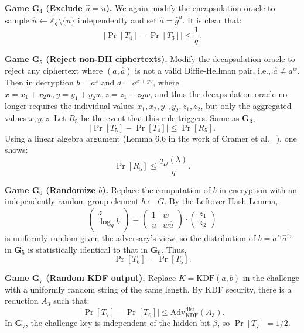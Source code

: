 \vspace{0.5em}
\noindent\textbf{Game $\mathbf{G}_4$ (Exclude $\hat{u} = u$).} 
We again modify the encapsulation oracle to sample $\hat{u} \gets \mathbb{Z}_q \setminus \{u\}$ independently and set $\hat{a} = \hat{g}^{\hat{u}}$. It is clear that:
$$
|\Pr[T_4] - \Pr[T_3]| \le \frac{1}{q}.
$$

\vspace{0.5em}
\noindent\textbf{Game $\mathbf{G}_5$ (Reject non-DH ciphertexts).} 
Modify the decapsulation oracle to reject any ciphertext where $(a, \hat{a})$ is not a valid Diffie-Hellman pair, i.e., $\hat{a}\ne a^w$. Then in decryption $b = a^z$ and $d = a^{x+yv}$, where $x=x_1+x_2w, y=y_1+y_2w, z=z_1+z_2w$, and thus the decapsulation oracle no longer requires the individual values $x_1, x_2, y_1, y_2, z_1, z_2$, but only the aggregated values $x, y, z$.
Let $R_5$ be the event that this rule triggers. Same as $\mathbf{G}_3$,
$$
|\Pr[T_5] - \Pr[T_4]| \le \Pr[R_5].
$$
Using a linear algebra argument (Lemma 6.6 in the work of Cramer et al. ~\cite{cramer2003design}), one shows:
$$
\Pr[R_5] \le \frac{q_D(\lambda)}{q}.
$$

\vspace{0.5em}
\noindent\textbf{Game $\mathbf{G}_6$ (Randomize $b$).} 
Replace the computation of $b$ in encryption with an independently random group element $b \gets G$.
By the Leftover Hash Lemma,
$$
\begin{pmatrix}z \\ \log_g b\end{pmatrix} = \begin{pmatrix}1 & w \\ u & w\hat{u}\end{pmatrix} \cdot \begin{pmatrix}z_1 \\ z_2\end{pmatrix}
$$
is uniformly random given the adversary's view, so the distribution of $b=a^{z_1} \hat{a}^{z_2}$ in $\mathbf{G}_5$ is statistically identical to that in $\mathbf{G}_6$. Thus,  
$$  
\Pr[T_6] = \Pr[T_5].  
$$

\vspace{0.5em}
\noindent\textbf{Game $\mathbf{G}_7$ (Random KDF output).} 
Replace $K = \text{KDF}(a,b)$ in the challenge with a uniformly random string of the same length. By KDF security, there is a reduction $A_3$ such that:
$$
|\Pr[T_7] - \Pr[T_6]| \le \text{Adv}_{\mathrm{KDF}}^{\text{dist}}(A_3).
$$
In $\mathbf{G}_7$, the challenge key is independent of the hidden bit $\beta$, so $\Pr[T_7] = 1/2$.

